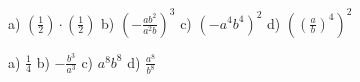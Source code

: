 \begin{tehtavasivu}
 \begin{tehtava}
        a) $(\frac{1}{2})\cdot(\frac{1}{2})$ \qquad
        b) $(-\frac{ab^2}{a^2b})^3$ \qquad
        c) $(-a^4b^4)^2$ \qquad
        d) $\left((\frac{a}{b})^4\right)^2$
        
        \begin{vastaus}
            a) $\frac{1}{4}$ \qquad
            b) $-\frac{b^3}{a^3}$ \qquad
            c) $a^8b^8$ \qquad
            d) $\frac{a^8}{b^8}$
        \end{vastaus}
    \end{tehtava}

\end{tehtavasivu}
